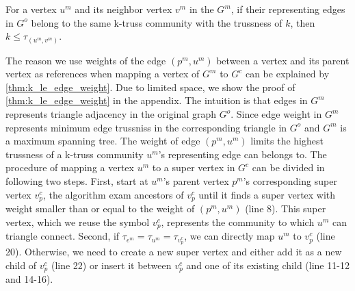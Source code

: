 \begin{Thm}
For a vertex $u^m$ and its neighbor vertex $v^m$ in the \inducedgraph{} $G^m$, if their representing edges in $G^o$ belong to the same k-truss community with the trussness of $k$, then $k \le \tau_{(u^m,v^m)}$. 
\label{thm:k_le_edge_weight}
\end{Thm}

The reason we use weights of the edge $(p^m, u^m)$ between a vertex and its parent vertex as references when mapping a vertex of $G^m$ to $G^c$ can be explained by \autoref{thm:k_le_edge_weight}.  Due to limited space, we show the proof of \autoref{thm:k_le_edge_weight} in the appendix. The intuition is that edges in $G^m$ represents triangle adjacency in the original graph $G^o$. Since edge weight in $G^m$ represents minimum edge trussniss in the corresponding triangle in $G^o$ and $G^m$ is a maximum spanning tree. The weight of edge $(p^m, u^m)$ limits the highest trussness of a k-truss community $u^m$'s representing edge can belongs to. The procedure of mapping a vertex $u^m$ to a super vertex in $G^c$ can be divided in following two steps. First, start at $u^m$'s parent vertex $p^m$'s corresponding super vertex $v^{c}_{p}$, the algorithm exam ancestors of $v^{c}_{p}$ until it finds a super vertex with weight smaller than or equal to the weight of $(p^m, u^m)$ (line 8). This super vertex, which we reuse the symbol $v^{c}_{p}$, represents the community to which $u^m$ can triangle connect. Second, if $\tau_{e^m} = \tau_{u^m} = \tau_{v^{c}_{p}}$, we can directly map $u^m$ to $v^{c}_{p}$ (line 20). Otherwise, we need to create a new super vertex and either add it as a new child of $v^{c}_{p}$ (line 22) or insert it between $v^{c}_{p}$ and one of its existing child (line 11-12 and 14-16).

